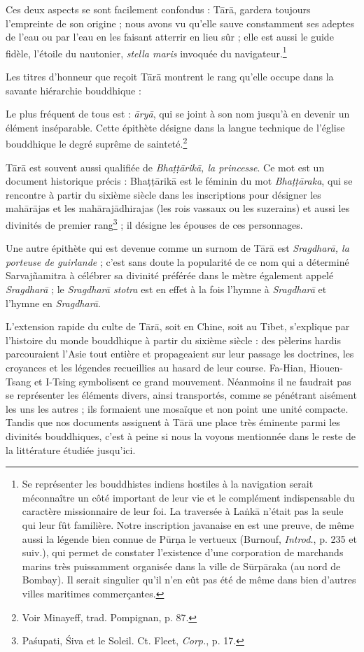\documentclass[a4paper, 11pt, oneside, french]{article}
\begin{document}
Ces deux aspects se sont facilement confondus : T\={a}r\={a}, gardera toujours l'empreinte de son origine ; nous avons vu qu'elle sauve constamment ses adeptes de l'eau ou par l'eau en les faisant atterrir en lieu sûr ; elle est aussi le guide fidèle, l'étoile du nautonier, \emph{stella maris} invoquée du navigateur.\footnote{Se représenter les bouddhistes indiens hostiles à la navigation serait méconnaître un côté important de leur vie et le complément indispensable du caractère missionnaire de leur foi. La traversée à La\.{n}k\={a} n'était pas la seule qui leur fût familière. Notre inscription javanaise en est une preuve, de même aussi la légende bien connue de P\={u}r\d{n}a le vertueux (Burnouf, \emph{Introd.}, p. 235 et suiv.), qui permet de constater l'existence d'une corporation de marchands marins très puissamment organisée dans la ville de S\={u}rp\={a}raka (au nord de Bombay). Il serait singulier qu'il n'en eût pas été de même dans bien d'autres villes maritimes commerçantes.}

Les titres d'honneur que reçoit T\={a}r\={a} montrent le rang qu'elle occupe dans la savante hiérarchie bouddhique :

Le plus fréquent de tous est : \emph{\={a}ry\={a}}, qui se joint à son nom jusqu'à en devenir un élément inséparable. Cette épithète désigne dans la langue technique de l'église bouddhique le degré suprême de sainteté.\footnote{Voir Minayeff, trad. Pompignan, p. 87.}

T\={a}r\={a} est souvent aussi qualifiée de \emph{Bha\d{t}\d{t}\={a}rik\={a}, la princesse}. Ce mot est un document historique précis : Bha\d{t}\d{t}\={a}rik\={a} est le féminin du mot \emph{Bha\d{t}\d{t}\={a}raka}, qui se rencontre à partir du sixième siècle dans les inscriptions pour désigner les mah\={a}r\={a}jas et les mah\={a}raj\={a}dhirajas (les rois vassaux ou les suzerains) et aussi les divinités de premier rang\footnote{Pa\'{s}upati, \'{S}iva et le Soleil. Ct. Fleet, \emph{Corp.}, p. 17.} ; il désigne les épouses de ces personnages.

Une autre épithète qui est devenue comme un surnom de T\={a}r\={a} est \emph{Sragdhar\={a}, la porteuse de guirlande} ; c'est sans doute la popularité de ce nom qui a déterminé Sarvaj\~{n}amitra à célébrer sa divinité préférée dans le mètre également appelé \emph{Sragdhar\={a}} ; le \emph{Sragdhar\={a} stotra} est en effet à la fois l'hymne à \emph{Sragdhar\={a}} et l'hymne en \emph{Sragdhar\={a}}.

L'extension rapide du culte de T\={a}r\={a}, soit en Chine, soit au Tibet, s'explique par l'histoire du monde bouddhique à partir du sixième siècle : des pèlerins hardis parcouraient l'Asie tout entière et propageaient sur leur passage les doctrines, les croyances et les légendes recueillies au hasard de leur course. Fa-Hian, Hiouen-Tsang et I-Tsing symbolisent ce grand mouvement. Néanmoins il ne faudrait pas se représenter les éléments divers, ainsi transportés, comme se pénétrant aisément les uns les autres ; ils formaient une mosaïque et non point une unité compacte. Tandis que nos documents assignent à T\={a}r\={a} une place très éminente parmi les divinités bouddhiques, c'est à peine si nous la voyons mentionnée dans le reste de la littérature étudiée jusqu'ici.
\end{document}
